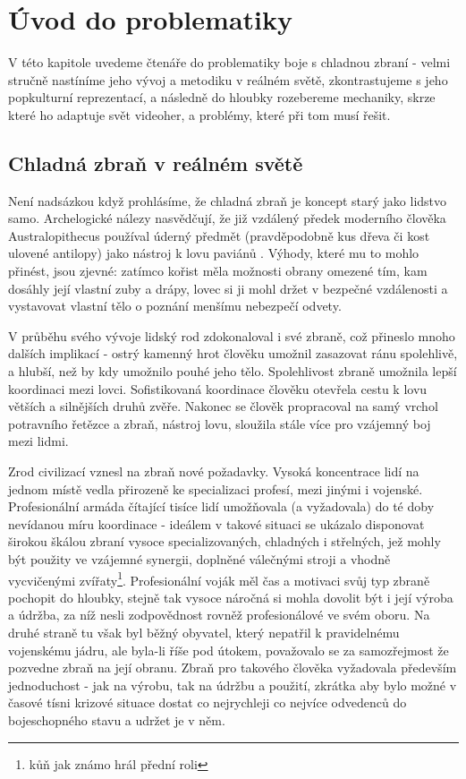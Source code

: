 \chapter{Úvod do problematiky}
V této kapitole uvedeme čtenáře do problematiky boje s chladnou zbraní - velmi stručně nastíníme jeho vývoj a metodiku v reálném světě, zkontrastujeme s jeho popkulturní reprezentací, a následně do hloubky rozebereme mechaniky, skrze které ho adaptuje svět videoher, a problémy, které při tom musí řešit.


\section{Chladná zbraň v reálném světě}
Není nadsázkou když prohlásíme, že chladná zbraň je koncept starý jako lidstvo samo. Archelogické nálezy nasvědčují, že již vzdálený předek moderního člověka Australopithecus používal úderný předmět (pravděpodobně kus dřeva či kost ulovené antilopy) jako nástroj k lovu paviánů \cite{AustralopithecusWeapon}. Výhody, které mu to mohlo přinést, jsou zjevné: zatímco kořist měla možnosti obrany omezené tím, kam dosáhly její vlastní zuby a drápy, lovec si ji mohl držet v bezpečné vzdálenosti a vystavovat vlastní tělo o poznání menšímu nebezpečí odvety.

V průběhu svého vývoje lidský rod zdokonaloval i své zbraně, což přineslo mnoho dalších implikací - ostrý kamenný hrot člověku umožnil zasazovat ránu spolehlivě, a hlubší, než by kdy umožnilo pouhé jeho tělo. Spolehlivost zbraně umožnila lepší koordinaci mezi lovci. Sofistikovaná koordinace člověku otevřela cestu k lovu větších a silnějších druhů zvěře. Nakonec se člověk propracoval na samý vrchol potravního řetězce a zbraň, nástroj lovu, sloužila stále více pro vzájemný boj mezi lidmi. 

Zrod civilizací vznesl na zbraň nové požadavky. Vysoká koncentrace lidí na jednom místě vedla přirozeně ke specializaci profesí, mezi jinými i vojenské. Profesionální armáda čítající tisíce lidí umožňovala (a vyžadovala) do té doby nevídanou míru koordinace - ideálem v takové situaci se ukázalo disponovat širokou škálou zbraní vysoce specializovaných, chladných i střelných, jež mohly být použity ve vzájemné synergii, doplněné válečnými stroji a vhodně vycvičenými zvířaty\footnote{kůň jak známo hrál přední roli}. Profesionální voják měl čas a motivaci svůj typ zbraně pochopit do hloubky, stejně tak vysoce náročná si mohla dovolit být i její výroba a údržba, za níž nesli zodpovědnost rovněž profesionálové ve svém oboru. 
Na druhé straně tu však byl běžný obyvatel, který nepatřil k pravidelnému vojenskému jádru, ale byla-li říše pod útokem, považovalo se za samozřejmost že pozvedne zbraň na její obranu. Zbraň pro takového člověka vyžadovala především jednoduchost - jak na výrobu, tak na údržbu a použití, zkrátka aby bylo možné v časové tísni krizové situace dostat co nejrychleji co nejvíce odvedenců do bojeschopného stavu a udržet je v něm.


